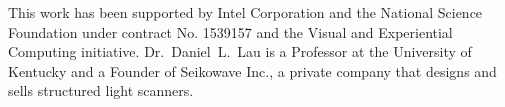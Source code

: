 \documentclass[]{spie}  %
\begin{document}
%




\acknowledgments
This work has been supported by Intel Corporation and the National Science Foundation under contract No. 1539157 and the Visual and Experiential Computing initiative. Dr.~Daniel~L.~Lau is a Professor at the University of Kentucky and a Founder of Seikowave Inc., a private company that designs and sells structured light scanners.

\end{document}
